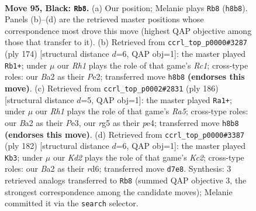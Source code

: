 \documentclass[11pt]{article}
\begin{document}
\clearpage

\begin{figure}[p]\centering
\begin{subfigure}{0.46\textwidth}\centering
\resizebox{\linewidth}{!}{%
\newchessgame
\chessboard[
  setfen={7r/3k4/1P6/6R1/8/4K3/b7/5R2 b - - 10 95},
  showmover=false,
  pgfstyle=straightmove, color=movearrow, markmove={h8-b8}
]}
\caption{}
\end{subfigure}\hfill
\begin{subfigure}{0.46\textwidth}\centering
\resizebox{\linewidth}{!}{%
\newchessgame
\chessboard[
  setfen={8/8/3r4/1k6/8/4p1K1/4P3/2R5 w - - 18 88},
  showmover=false,
  pgfstyle=straightmove, color=movearrow, markmove={c1-b1}
]}
\caption{}
\end{subfigure}
\\[4pt]
\begin{subfigure}{0.46\textwidth}\centering
\resizebox{\linewidth}{!}{%
\newchessgame
\chessboard[
  setfen={8/7r/8/R7/4p3/4P3/6K1/3k4 w - - 8 94},
  showmover=false,
  pgfstyle=straightmove, color=movearrow, markmove={a5-a1}
]}
\caption{}
\end{subfigure}\hfill
\begin{subfigure}{0.46\textwidth}\centering
\resizebox{\linewidth}{!}{%
\newchessgame
\chessboard[
  setfen={1R6/r7/3r4/8/7R/8/2K3k1/8 w - - 18 92},
  showmover=false,
  pgfstyle=straightmove, color=movearrow, markmove={c2-b3}
]}
\caption{}
\end{subfigure}
\caption{\textbf{Move 95, Black: \texttt{Rb8}.} (a) Our position; Melanie plays \texttt{Rb8} (\texttt{h8b8}). Panels (b)--(d) are the retrieved master positions whose correspondence most drove this move (highest QAP objective among those that transfer to it). (b) Retrieved from \texttt{ccrl\_top\_p0000\#3287} (ply 174) [structural distance $d$=6, QAP obj=1]: the master played \texttt{Rb1+}; under $\mu$ our \emph{Rh1} plays the role of that game's \emph{Rc1}; cross-type roles: our \emph{B}a2 as their \emph{P}e2; transferred move \texttt{h8b8} \textbf{(endorses this move)}. (c) Retrieved from \texttt{ccrl\_top\_p0002\#2831} (ply 186) [structural distance $d$=5, QAP obj=1]: the master played \texttt{Ra1+}; under $\mu$ our \emph{Rh1} plays the role of that game's \emph{Ra5}; cross-type roles: our \emph{B}a2 as their \emph{P}e3, our \emph{r}g5 as their \emph{p}e4; transferred move \texttt{h8b8} \textbf{(endorses this move)}. (d) Retrieved from \texttt{ccrl\_top\_p0000\#3387} (ply 182) [structural distance $d$=6, QAP obj=1]: the master played \texttt{Kb3}; under $\mu$ our \emph{Kd2} plays the role of that game's \emph{Kc2}; cross-type roles: our \emph{B}a2 as their \emph{r}d6; transferred move \texttt{d7e8}. Synthesis: 3 retrieved analogs transferred to \texttt{Rb8} (summed QAP objective 3, the strongest correspondence among the candidate moves); Melanie committed it via the \texttt{search} selector.}
\label{fig:thought-m189}
\end{figure}
\end{document}
